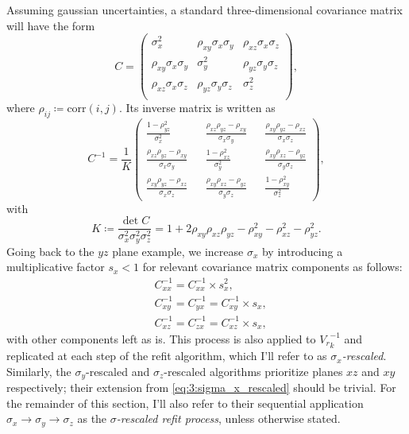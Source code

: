 Assuming gaussian uncertainties, a standard three-dimensional covariance matrix will have the form
\begin{equation}
C = \begin{pmatrix}
	\sigma_x^2 & \rho_{xy} \sigma_x \sigma_y & \rho_{xz} \sigma_x \sigma_z \\
	\rho_{xy} \sigma_x \sigma_y & \sigma_y^2 & \rho_{yz} \sigma_y \sigma_z \\
	\rho_{xz} \sigma_x \sigma_z & \rho_{yz} \sigma_y \sigma_z & \sigma_z^2 \\
\end{pmatrix},
\label{eq:3:gaussian_covmatrix}
\end{equation}
where $\rho_{ij} \coloneqq \text{corr}(i,j)$. Its inverse matrix is written as
\begin{equation}
C^{-1} = \frac{1}{K} \begin{pmatrix}
\frac{1-\rho_{yz}^2}{\sigma_x^2} &&
\frac{\rho_{xz}\rho_{yz} - \rho_{xy}}{\sigma_x \sigma_y} &&
\frac{\rho_{xy}\rho_{yz} - \rho_{xz}}{\sigma_x \sigma_z} \\
\frac{\rho_{xz}\rho_{yz} - \rho_{xy}}{\sigma_x \sigma_y} &&
\frac{1-\rho_{xz}^2}{\sigma_y^2} &&
\frac{\rho_{xy}\rho_{xz} - \rho_{yz}}{\sigma_y \sigma_z} \\
\frac{\rho_{xy}\rho_{yz} - \rho_{xz}}{\sigma_x \sigma_z} &&
\frac{\rho_{xy}\rho_{xz} - \rho_{yz}}{\sigma_y \sigma_z} &&
\frac{1-\rho_{xy}^2}{\sigma_z^2}
\end{pmatrix},
\label{eq:3:inverse_gaussian_covmatrix}
\end{equation}
with
\begin{equation}
K \coloneqq \frac{\det C}{\sigma_x^2 \sigma_y^2 \sigma_z^2} = 1+2\rho_{xy} \rho_{xz} \rho_{yz} - \rho_{xy}^2 - \rho_{xz}^2 - \rho_{yz}^2.
\end{equation}
Going back to the $yz$ plane example, we increase $\sigma_x$ by introducing a multiplicative factor $s_x < 1$ for relevant covariance matrix components as follows:
\begin{equation}
\begin{aligned}
&C^{-1}_{xx} = C^{-1}_{xx} \times s_x^2, \\
&C^{-1}_{xy} = C^{-1}_{yx} = C^{-1}_{xy} \times s_x, \\
&C^{-1}_{xz} = C^{-1}_{zx} = C^{-1}_{xz} \times s_x,
\end{aligned}
\label{eq:3:sigma_x_rescaled}
\end{equation}
with other components left as is.
This process is also applied to ${V_r}_k^{-1}$ and replicated at each step of the refit algorithm, which I'll refer to as \textit{$\sigma_x$-rescaled}.
Similarly, the $\sigma_y$-rescaled and $\sigma_z$-rescaled algorithms prioritize planes $xz$ and $xy$ respectively;
their extension from \eqref{eq:3:sigma_x_rescaled} should be trivial.
For the remainder of this section, I'll also refer to their sequential application $\sigma_x \rightarrow \sigma_y \rightarrow \sigma_z$ as the \textit{$\sigma$-rescaled refit process}, unless otherwise stated.

